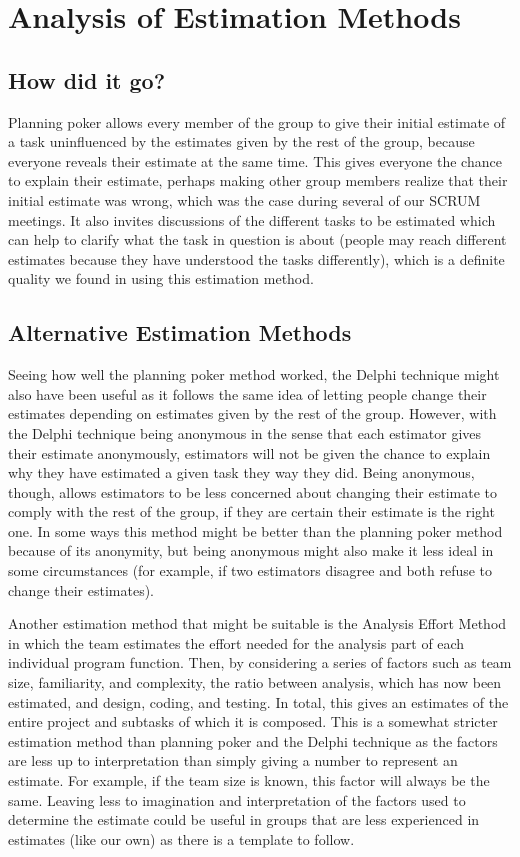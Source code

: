 \section{Analysis of Estimation Methods}
\subsection{How did it go?}
Planning poker allows every member of the group to give their initial estimate of a task uninfluenced by the estimates given by the rest of the group, because everyone reveals their estimate at the same time. This gives everyone the chance to explain their estimate, perhaps making other group members realize that their initial estimate was wrong, which was the case during several of our SCRUM meetings. It also invites discussions of the different tasks to be estimated which can help to clarify what the task in question is about (people may reach different estimates because they have understood the tasks differently), which is a definite quality we found in using this estimation method.

\subsection{Alternative Estimation Methods}
Seeing how well the planning poker method worked, the Delphi technique might also have been useful as it follows the same idea of letting people change their estimates depending on estimates given by the rest of the group. However, with the Delphi technique being anonymous in the sense that each estimator gives their estimate anonymously, estimators will not be given the chance to explain why they have estimated a given task they way they did. Being anonymous, though, allows estimators to be less concerned about changing their estimate to comply with the rest of the group, if they are certain their estimate is the right one. In some ways this method might be better than the planning poker method because of its anonymity, but being anonymous might also make it less ideal in some circumstances (for example, if two estimators disagree and both refuse to change their estimates).

Another estimation method that might be suitable is the Analysis Effort Method in which the team estimates the effort needed for the analysis part of each individual program function. Then, by considering a series of factors such as team size, familiarity, and complexity, the ratio between analysis, which has now been estimated, and design, coding, and testing. In total, this gives an estimates of the entire project and subtasks of which it is composed. This is a somewhat stricter estimation method than planning poker and the Delphi technique as the factors are less up to interpretation than simply giving a number to represent an estimate. For example, if the team size is known, this factor will always be the same. Leaving less to imagination and interpretation of the factors used to determine the estimate could be useful in groups that are less experienced in estimates (like our own) as there is a template to follow.